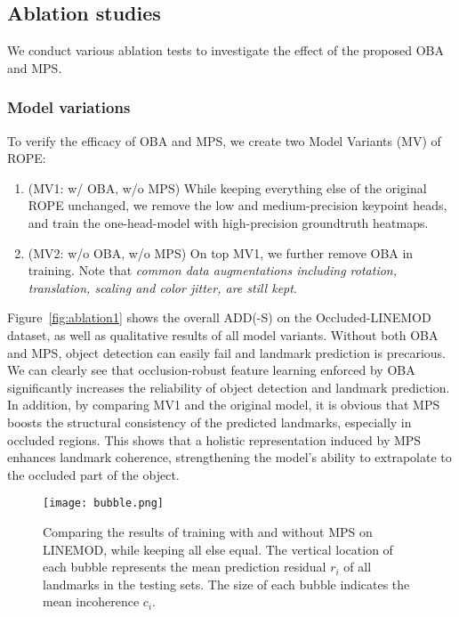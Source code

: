 \documentclass[10pt,twocolumn,letterpaper]{article}
\begin{document}
\subsection{Ablation studies}
\label{sec:ablation}
We conduct various ablation tests to investigate the effect of the proposed OBA and MPS. 

\subsubsection{Model variations}
\label{sec:mvs}

To verify the efficacy of OBA and MPS, we create two Model Variants (MV) of ROPE: 
\begin{enumerate}
    \item (MV1: w/ OBA, w/o MPS) While keeping everything else of the original ROPE unchanged, we remove the low and medium-precision keypoint heads, and train the one-head-model with high-precision groundtruth heatmaps.
    
    \item (MV2: w/o OBA, w/o MPS) On top MV1, we further remove OBA in training. Note that \emph{common data augmentations including rotation, translation, scaling and color jitter, are still kept}. 
\end{enumerate}



Figure~\ref{fig:ablation1} shows the overall ADD(-S) on the Occluded-LINEMOD dataset, as well as qualitative results of all model variants. Without both OBA and MPS, object detection can easily fail and landmark prediction is precarious. We can clearly see that occlusion-robust feature learning enforced by OBA significantly increases the reliability of object detection and landmark prediction. In addition, by comparing MV1 and the original model, it is obvious that MPS boosts the structural consistency of the predicted landmarks, especially in occluded regions. This shows that a holistic representation induced by MPS enhances landmark coherence, strengthening the model's ability to extrapolate to the occluded part of the object.

\begin{figure}[t]
    \centering
    \texttt{[image: bubble.png]}
    \caption{Comparing the results of training with and without MPS on LINEMOD, while keeping all else equal. The vertical location of each bubble represents the mean prediction residual $r_i$ of all landmarks in the testing sets. The size of each bubble indicates the mean incoherence $c_i$.  }
    \label{fig:mps}
\end{figure}
\end{document}
